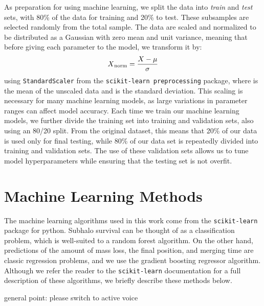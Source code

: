 \documentclass[fleqn,usenatbib]{mnras}
\newcommand\khb[1]{{\color{blue}#1}}
\begin{document}
\par
    As preparation for using machine learning, we split the data into \textit{train}  and \textit{test} sets, with 80\% of the data for training and 20\% to test. These subsamples are selected randomly from the total sample. The data are scaled and normalized to be distributed as a Gaussian with zero mean and unit variance, meaning that before giving each parameter to the model, we transform it by: 
    \begin{equation}
        X\textsubscript{norm} = \frac{X - \mu}{\sigma}
    \end{equation} 
    using \texttt{StandardScaler} from the \texttt{scikit-learn preprocessing} package, where \textmu{} is the mean of the unscaled data and \textsigma{} is the standard deviation. This scaling is necessary for many machine learning models, as large variations in parameter ranges can affect model accuracy.
    Each time we train our machine learning models, we further divide the training set into training and validation sets, also using an 80/20 split. From the original dataset, this means that 20\% of our data is used only for final testing, while 80\% of our data set is repeatedly divided into training and validation sets. The use of these validation sets allows us to tune model hyperparameters while ensuring that the testing set is not overfit. 

\section{Machine Learning Methods}
\label{sec:ML Methods}
The machine learning algorithms used in this work come from the \texttt{scikit-learn} package for python. Subhalo survival can be thought of as a classification problem, which is well-suited to a random forest algorithm. On the other hand, predictions of the amount of mass loss, the final position, and merging time are classic regression problems, and we use the gradient boosting regressor algorithm. Although we refer the reader to the \texttt{scikit-learn} documentation for a full description of these algorithms, we briefly describe these methods below.

\khb{general point: please switch to active voice}
\end{document}
